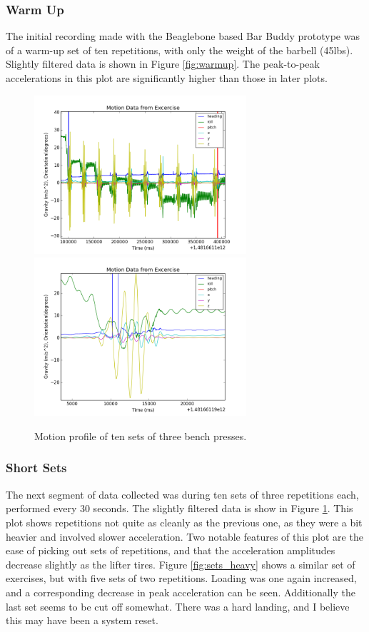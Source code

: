 \documentclass[11pt,oneside]{amsart}
\begin{document}
\subsubsection{Warm Up}
The initial recording made with the Beaglebone based Bar Buddy prototype was of a warm-up set of ten repetitions, with only the weight of the barbell (45lbs). Slightly filtered data is shown in Figure \ref{fig:warmup}. The peak-to-peak accelerations in this plot are significantly higher than those in later plots. 


\begin{figure}[htbp]
\begin{center}
\includegraphics[width=0.7\textwidth]{figures/bench_sets.png}
\includegraphics[width=0.7\textwidth]{figures/bench_sets_detail.png}
\caption{Motion profile of ten sets of three bench presses.}
\label{fig:sets}
\end{center}
\end{figure}
\subsubsection{Short Sets}
The next segment of data collected was during ten sets of three repetitions each, performed every 30 seconds. The slightly filtered data is show in Figure \ref{fig:sets}. This plot shows repetitions not quite as cleanly as the previous one, as they were a bit heavier and involved slower acceleration. Two notable features of this plot are the ease of picking out sets of repetitions, and that the acceleration amplitudes decrease slightly as the lifter tires. Figure \ref{fig:sets_heavy} shows a similar set of exercises, but with five sets of two repetitions.  Loading was one again increased, and a corresponding decrease in peak acceleration can be seen. Additionally the last set seems to be cut off somewhat. There was a hard landing, and I believe this may have been a system reset.
\end{document}
